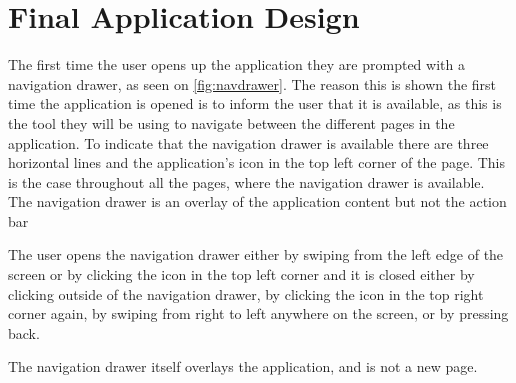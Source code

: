 \section{Final Application Design}

The first time the user opens up the application they are prompted with a navigation drawer, as seen on \autoref{fig:navdrawer}. The reason this is shown the first time the application is opened is to inform the user that it is available, as this is the tool they will be using to navigate between the different pages in the application. To indicate that the navigation drawer is available there are three horizontal lines and the application's icon in the top left corner of the page. This is the case throughout all the pages, where the navigation drawer is available. The navigation drawer is an overlay of the application content but not the action bar

The user opens the navigation drawer either by swiping from the left edge of the screen or by clicking the icon in the top left corner and it is closed either by clicking outside of the navigation drawer, by clicking the icon in the top right corner again, by swiping from right to left anywhere on the screen, or by pressing back.

The navigation drawer itself overlays the application, and is not a new page.\citep{diamond}